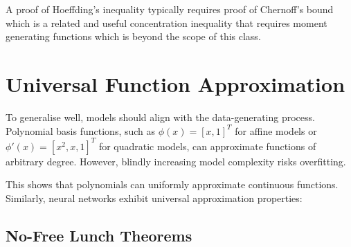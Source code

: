 A proof of Hoeffding’s inequality typically requires proof of Chernoff’s bound which is a related and useful concentration inequality that requires moment generating functions which is beyond the scope of this class.

\section{Universal Function Approximation}

To generalise well, models should align with the data-generating process. Polynomial basis functions, such as $\phi(x) = [x, 1]^T$ for affine models or $\phi'(x) = [x^2, x, 1]^T$ for quadratic models, can approximate functions of arbitrary degree. However, blindly increasing model complexity risks overfitting.


This shows that polynomials can uniformly approximate continuous functions. Similarly, neural networks exhibit universal approximation properties:



\subsection{No-Free Lunch Theorems}

